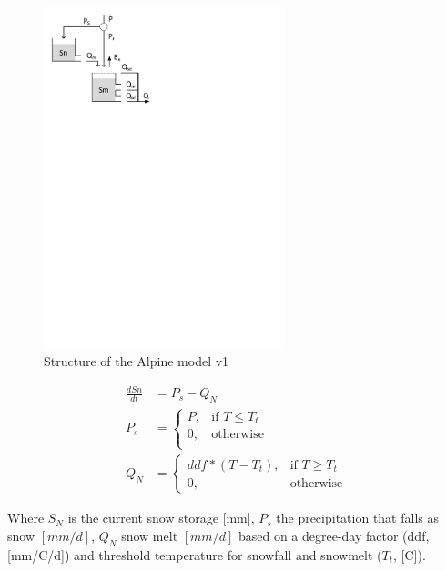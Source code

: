 { 																	%
\begin{figure}
\includegraphics[trim=1cm 21.5cm 9cm 1cm,width=7cm,keepaspectratio]{./files/12_schematic.pdf}
\caption{Structure of the Alpine model v1} \label{fig:12_schematic}
\end{figure}

\begin{align}
	\frac{dSn}{dt} &= P_s-Q_N \\
	P_s &= \begin{cases}
		P, &\text{if } T \leq T_t \\
		0, & \text{otherwise} \\
	\end{cases} \\
	Q_N &= 
	\begin{cases}
		ddf*(T - T_t), & \text{if } T \geq T_t \\
		0, & \text{otherwise}
	\end{cases}
\end{align}

Where $S_N$ is the current snow storage [mm], $P_s$ the precipitation that falls as snow $[mm/d]$, $Q_N$ snow melt $[mm/d]$ based on a degree-day factor (ddf, [mm/\degree C/d]) and threshold temperature for snowfall and snowmelt ($T_t$, [\degree C]).

}

